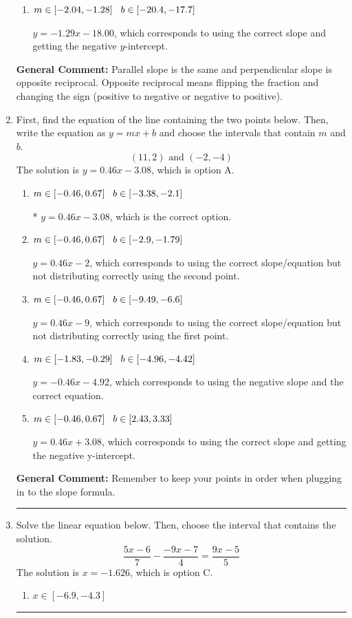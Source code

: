 \documentclass{extbook}[14pt]
\newcommand{\litem}[1]{\item #1

\rule{\textwidth}{0.4pt}}
\begin{document}
\begin{enumerate}
{\begin{enumerate}[label=\Alph*.]
* $y = -1.29x + 18.00$, which is the correct option.
\item \( m \in [-2.04, -1.28] \hspace*{3mm} b \in [-20.4, -17.7] \)

 $y = -1.29x - 18.00$, which corresponds to using the correct slope and getting the negative $y$-intercept.
\end{enumerate}

\textbf{General Comment:} Parallel slope is the same and perpendicular slope is opposite reciprocal. Opposite reciprocal means flipping the fraction and changing the sign (positive to negative or negative to positive).
}
\litem{
First, find the equation of the line containing the two points below. Then, write the equation as $ y=mx+b $ and choose the intervals that contain $m$ and $b$.
\[ (11, 2) \text{ and } (-2, -4) \]
The solution is \( y = 0.46x -3.08 \), which is option A.\begin{enumerate}[label=\Alph*.]
\item \( m \in [-0.46, 0.67] \hspace*{3mm} b \in [-3.38, -2.1] \)

* $y = 0.46x -3.08$, which is the correct option.
\item \( m \in [-0.46, 0.67] \hspace*{3mm} b \in [-2.9, -1.79] \)

 $y = 0.46x -2$, which corresponds to using the correct slope/equation but not distributing correctly using the second point.
\item \( m \in [-0.46, 0.67] \hspace*{3mm} b \in [-9.49, -6.6] \)

 $y = 0.46x -9$, which corresponds to using the correct slope/equation but not distributing correctly using the first point.
\item \( m \in [-1.83, -0.29] \hspace*{3mm} b \in [-4.96, -4.42] \)

 $y = -0.46x -4.92$, which corresponds to using the negative slope and the correct equation.
\item \( m \in [-0.46, 0.67] \hspace*{3mm} b \in [2.43, 3.33] \)

 $y = 0.46x + 3.08$, which corresponds to using the correct slope and getting the negative y-intercept.
\end{enumerate}

\textbf{General Comment:} Remember to keep your points in order when plugging in to the slope formula.
}
\litem{
Solve the linear equation below. Then, choose the interval that contains the solution.
\[ \frac{5x -6}{7} - \frac{-9x -7}{4} = \frac{9x -5}{5} \]
The solution is \( x = -1.626 \), which is option C.\begin{enumerate}[label=\Alph*.]
\item \( x \in [-6.9, -4.3] \)


\end{enumerate}}
\end{enumerate}
\end{document}
